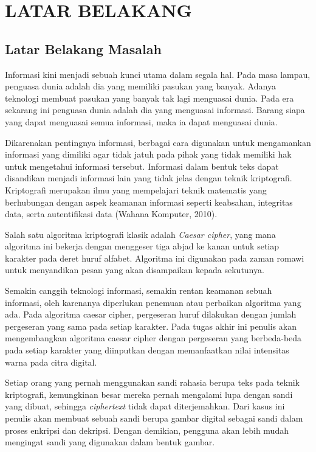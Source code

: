 \documentclass{jtetiproposalskripsi}
\begin{document}
\chapter{LATAR BELAKANG}

\section{Latar Belakang Masalah}
Informasi kini menjadi sebuah kunci utama dalam segala hal. Pada masa lampau, penguasa dunia adalah dia yang memiliki pasukan yang banyak. Adanya teknologi membuat pasukan yang banyak tak lagi menguasai dunia. Pada era sekarang ini penguasa dunia adalah dia yang menguasai informasi. Barang siapa yang dapat menguasai semua informasi, maka ia dapat menguasai dunia.

Dikarenakan pentingnya informasi, berbagai cara digunakan untuk mengamankan informasi yang dimiliki agar tidak jatuh pada pihak yang tidak memiliki hak untuk mengetahui informasi tersebut. Informasi dalam bentuk teks dapat disandikan menjadi informasi lain yang tidak jelas dengan teknik kriptografi. Kriptografi merupakan ilmu yang mempelajari teknik matematis yang berhubungan dengan aspek keamanan informasi seperti keabsahan, integritas data, serta autentifikasi data (Wahana Komputer, 2010). 

Salah satu algoritma kriptografi klasik adalah \emph{Caesar cipher}, yang mana algoritma ini bekerja dengan menggeser tiga abjad ke kanan untuk setiap karakter pada deret huruf alfabet. Algoritma ini digunakan pada zaman romawi untuk menyandikan pesan yang akan disampaikan kepada sekutunya.

Semakin canggih teknologi informasi, semakin rentan keamanan sebuah informasi, oleh karenanya diperlukan penemuan atau perbaikan algoritma yang ada. Pada algoritma caesar cipher, pergeseran huruf dilakukan dengan jumlah pergeseran yang sama pada setiap karakter. Pada tugas akhir ini penulis akan mengembangkan algoritma caesar cipher dengan pergeseran yang berbeda-beda pada setiap karakter yang diinputkan dengan memanfaatkan nilai intensitas warna pada citra digital.

Setiap orang yang pernah menggunakan sandi rahasia berupa teks pada teknik kriptografi, kemungkinan besar mereka pernah mengalami lupa dengan sandi yang dibuat, sehingga \emph{ciphertext} tidak dapat diterjemahkan. Dari kasus ini penulis akan membuat sebuah sandi berupa gambar digital sebagai sandi dalam proses enkripsi dan dekripsi. Dengan demikian, pengguna akan lebih mudah mengingat sandi yang digunakan dalam bentuk gambar.
\end{document}
